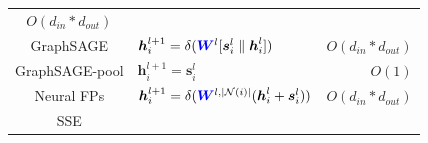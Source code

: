 \begin{table}
\begin{footnotesize}
\begin{tabular}{cp{20em}r}
            $O(d_{in} * d_{out})$                                                                                                                                                                                              \\
            GraphSAGE  \cite{hamilton2017_graphsage}                                                                                                                                                                         &
            $\boldsymbol{h}_i^{l+1} =   \delta(\textcolor{blue}{\boldsymbol{W}}^l  [\boldsymbol{s}_i^{l} \parallel \boldsymbol{h}_i^l])$                                                                                     &
            $O(d_{in} * d_{out})$                                                                                                                                                                                              \\
            GraphSAGE-pool   \cite{hamilton2017_graphsage}                                                                                                                                                                   &
            $\boldsymbol{h}_i^{l+1} = \boldsymbol{s}_i^l$                                                                                                                                                                    &
            $O(1)$                                                                                                                                                                                                             \\
            Neural FPs        \cite{duvenaud2015_neural_fps}                                                                                                                                                                 &
            $\boldsymbol{h}_i^{l+1} = \delta(\textcolor{blue}{\boldsymbol{W}}^{l, |\mathcal{N}(i)|}  (\boldsymbol{h}_i^l + \boldsymbol{s}_i^{l}))$                                                                           &
            $O(d_{in} * d_{out})$                                                                                                                                                                                              \\
            SSE             \cite{han2018_sse}                                                                                                                                                                               &

\end{tabular}
\end{footnotesize}
\end{table}
